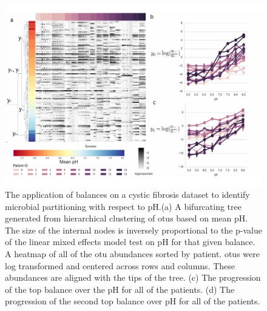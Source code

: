   \begin{figure}[H]
        \centering
        \includegraphics[width=1\textwidth]{ch3/Figure3.pdf}
        \caption[The application of balances on a cystic fibrosis dataset to identify
          microbial partitioning with respect to pH.]
        {The application of balances on a cystic fibrosis dataset to identify microbial partitioning with respect to pH.(a) A bifurcating tree generated from hierarchical clustering of \gls{otu}s based on mean pH.   The size of the internal nodes is inversely proportional to the p-value of the linear mixed effects model test on pH for that given balance.  A heatmap of all of the \gls{otu} abundances sorted by patient. \gls{otu}s were log transformed and centered across rows and columns. These abundances are aligned with the tips of the tree.  (c) The progression of the top balance over the pH for all of the patients.  (d) The progression of the second top balance over pH for all of the patients.}
        \label{figc3}
 \end{figure}
